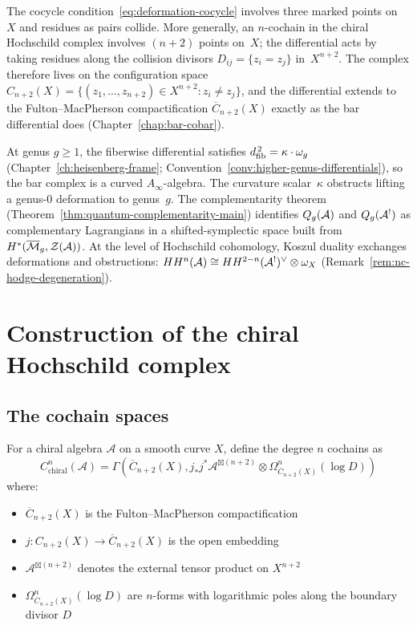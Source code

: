 The cocycle condition~\eqref{eq:deformation-cocycle} involves three
marked points on~$X$ and residues as pairs collide.  More generally,
an $n$-cochain in the chiral Hochschild complex involves $(n+2)$
points on~$X$; the differential acts by taking residues along the
collision divisors $D_{ij}=\{z_i=z_j\}$ in~$X^{n+2}$.  The complex
therefore lives on the configuration space
$C_{n+2}(X)=\{(z_1,\ldots,z_{n+2})\in X^{n+2}: z_i\neq z_j\}$,
and the differential extends to the Fulton--MacPherson
compactification $\overline{C}_{n+2}(X)$ exactly as the bar
differential does (Chapter~\ref{chap:bar-cobar}).

At genus $g\geq 1$, the fiberwise differential satisfies
$d_{\mathrm{fib}}^{\,2}=\kappa\cdot\omega_g$
(Chapter~\ref{ch:heisenberg-frame};
Convention~\ref{conv:higher-genus-differentials}), so the bar complex
is a curved $A_\infty$-algebra.  The curvature scalar~$\kappa$
obstructs lifting a genus-$0$ deformation to genus~$g$.  The
complementarity theorem
(Theorem~\ref{thm:quantum-complementarity-main}) identifies
$Q_g(\mathcal{A})$ and $Q_g(\mathcal{A}^!)$ as complementary Lagrangians in a
shifted-symplectic space built from
$H^*(\overline{\mathcal{M}}_g,\mathcal{Z}(\mathcal{A}))$.  At the level of
Hochschild cohomology, Koszul duality exchanges deformations and
obstructions:
$HH^n(\mathcal{A})\cong HH^{2-n}(\mathcal{A}^!)^\vee\otimes\omega_X$
(Remark~\ref{rem:nc-hodge-degeneration}).

\section{Construction of the chiral Hochschild complex}

\subsection{The cochain spaces}

\begin{definition}
For a chiral algebra $\mathcal{A}$ on a smooth curve $X$, define the degree $n$ cochains as
\[
C^n_{\text{chiral}}(\mathcal{A}) = \Gamma\left(\overline{C}_{n+2}(X), j_*j^*\mathcal{A}^{\boxtimes (n+2)} \otimes \Omega^n_{\overline{C}_{n+2}(X)}(\log D)\right)
\]
where:
\begin{itemize}
\item $\overline{C}_{n+2}(X)$ is the Fulton--MacPherson compactification
\item $j: C_{n+2}(X) \to \overline{C}_{n+2}(X)$ is the open embedding
\item $\mathcal{A}^{\boxtimes (n+2)}$ denotes the external tensor product on $X^{n+2}$
\item $\Omega^n_{\overline{C}_{n+2}(X)}(\log D)$ are $n$-forms with logarithmic poles along the boundary divisor $D$
\end{itemize}
\end{definition}

